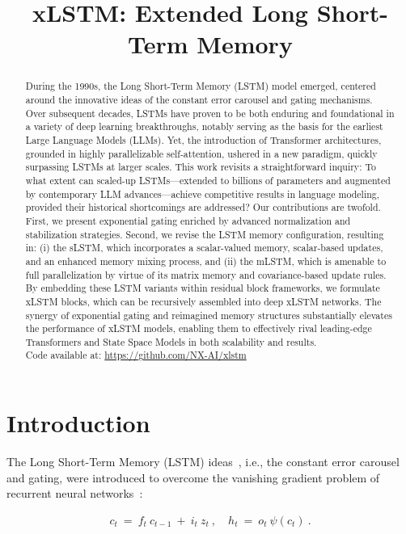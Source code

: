 \title{xLSTM: Extended Long Short-Term Memory}

\begin{abstract}
During the 1990s, the Long Short-Term Memory (LSTM) model emerged, centered around the innovative ideas of the constant error carousel and gating mechanisms. Over subsequent decades, LSTMs have proven to be both enduring and foundational in a variety of deep learning breakthroughs, notably serving as the basis for the earliest Large Language Models (LLMs). Yet, the introduction of Transformer architectures, grounded in highly parallelizable self-attention, ushered in a new paradigm, quickly surpassing LSTMs at larger scales. This work revisits a straightforward inquiry: To what extent can scaled-up LSTMs—extended to billions of parameters and augmented by contemporary LLM advances—achieve competitive results in language modeling, provided their historical shortcomings are addressed? Our contributions are twofold. First, we present exponential gating enriched by advanced normalization and stabilization strategies. Second, we revise the LSTM memory configuration, resulting in: (i) the sLSTM, which incorporates a scalar-valued memory, scalar-based updates, and an enhanced memory mixing process, and (ii) the mLSTM, which is amenable to full parallelization by virtue of its matrix memory and covariance-based update rules. By embedding these LSTM variants within residual block frameworks, we formulate xLSTM blocks, which can be recursively assembled into deep xLSTM networks. The synergy of exponential gating and reimagined memory structures substantially elevates the performance of xLSTM models, enabling them to effectively rival leading-edge Transformers and State Space Models in both scalability and results.\\
Code available at: \url{https://github.com/NX-AI/xlstm}
\end{abstract}

\section{Introduction}
\label{sec:intro}

The Long Short-Term Memory (LSTM) ideas~\citep{Hochreiter:91,Hochreiter:97nips,Hochreiter:97}, i.e., the constant error carousel and gating, were introduced to overcome the vanishing gradient problem of recurrent neural networks~\citep{Hochreiter:91,Hochreiter:00book}:

\begin{align}
\label{eq:lstm_idea}
  c_t \ = \ f_t \ c_{t-1} \ + \ 
          i_t \  z_t \ , \quad  
          h_t \ = \ o_t \ \psi({c_t}) \ . 
\end{align}

